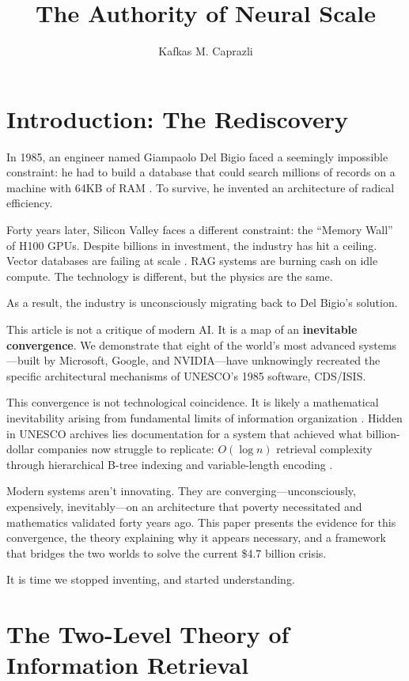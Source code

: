 \documentclass[manuscript,screen,nonacm]{acmart}
\title{The Authority of Neural Scale}
\author{Kafkas M. Caprazli}
\affiliation{%
  \institution{Independent Researcher}
  \city{Wolfsburg}
  \country{Germany}
}
\begin{document}
\maketitle

\section{Introduction: The Rediscovery}

In 1985, an engineer named Giampaolo Del Bigio faced a seemingly impossible constraint: he had to build a database that could search millions of records on a machine with 64KB of RAM \cite{delbigio1995}. To survive, he invented an architecture of radical efficiency.

Forty years later, Silicon Valley faces a different constraint: the ``Memory Wall'' of H100 GPUs. Despite billions in investment, the industry has hit a ceiling. Vector databases are failing at scale \cite{bruckhaus2024}. RAG systems are burning cash on idle compute. The technology is different, but the physics are the same.

As a result, the industry is unconsciously migrating back to Del Bigio's solution.

This article is not a critique of modern AI. It is a map of an \textbf{inevitable convergence}. We demonstrate that eight of the world's most advanced systems---built by Microsoft, Google, and NVIDIA---have unknowingly recreated the specific architectural mechanisms of UNESCO's 1985 software, CDS/ISIS.

This convergence is not technological coincidence. It is likely a mathematical inevitability arising from fundamental limits of information organization \cite{weller2025}. Hidden in UNESCO archives lies documentation for a system that achieved what billion-dollar companies now struggle to replicate: $O(\log n)$ retrieval complexity through hierarchical B-tree indexing and variable-length encoding \cite{unesco1989}.

Modern systems aren't innovating. They are converging---unconsciously, expensively, inevitably---on an architecture that poverty necessitated and mathematics validated forty years ago. This paper presents the evidence for this convergence, the theory explaining why it appears necessary, and a framework that bridges the two worlds to solve the current \$4.7 billion crisis.

It is time we stopped inventing, and started understanding.

\section{The Two-Level Theory of Information Retrieval}
\end{document}
